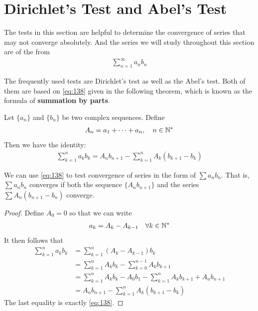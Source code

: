 \documentclass[thmcnt=section, 12pt]{my-elegantbook}
\begin{document}

\section{Dirichlet's Test and Abel's Test}

The tests in this section are helpful 
to determine the convergence of series 
that may not converge absolutely.
And the series we will study 
throughout this section are of the from 
\begin{align*}
	\sum_{n=1}^\infty a_n b_n
\end{align*}


The frequently used tests are Dirichlet's test
as well as the Abel's test.
Both of them are based on 
\eqref{eq:138} given in the following theorem,
which is known as the formula of 
\textbf{summation by parts}.

\begin{theorem} \label{thm:73}
	Let $\{a_n\}$ and $\{b_n\}$ be two complex sequences.
	Define
	\begin{align*}
		A_n = a_1 + \cdots + a_n,
		\quad n \in \mathbb{N}^\ast
	\end{align*}
	Then we have the identity:
	\begin{align}
		\sum_{k=1}^n a_k b_k 
		= A_n b_{n+1}
			- \sum_{k=1}^n A_k (b_{k+1} - b_k)
		\label{eq:138}
	\end{align}
\end{theorem}

\begin{note}
	We can use \eqref{eq:138} to test convergence of 
	series in the form of $\sum a_n b_n$.
	That is, $\sum a_n b_n$ converges 
	if both the sequence $\{A_n b_{n+1}\}$ 
	and the series $\sum A_n(b_{n+1} - b_n)$ converge.
\end{note}

\begin{proof}
	Define $A_0 = 0$ so that we can write 
	\begin{align*}
		a_k = A_{k} - A_{k-1}
		\quad \forall k \in \mathbb{N}^\ast 
	\end{align*}
	It then follows that 
	\begin{align*}
		\sum_{k=1}^n a_k b_k 
		&= \sum_{k=1}^n (A_{k} - A_{k-1}) b_k \\ 
		&= \sum_{k=1}^n A_k b_k
		- \sum_{k=0}^{n-1} A_k b_{k+1} \\ 
		&= \sum_{k=1}^n A_k b_k
			- A_0 b_1 - \sum_{k=1}^n A_k b_{k+1}
			+ A_n b_{n+1} \\
		&=	A_n b_{n+1} 
			- \sum_{k=1}^n A_k (b_{k+1} - b_k)
	\end{align*}
	The last equality is exactly \eqref{eq:138}.
\end{proof}
\end{document}
